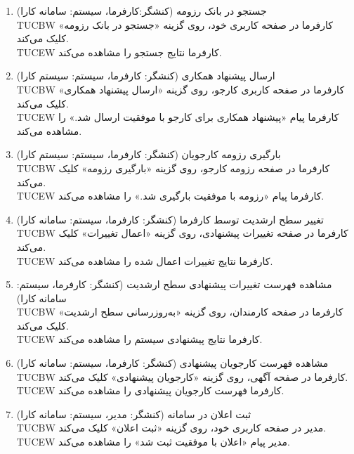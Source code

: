 \documentclass[12pt]{article}
\begin{document}
\begin{enumerate}
		\item
		جستجو در بانک رزومه (کنشگر:‌کارفرما، سیستم: سامانه کارا)\\
		TUCBW کارفرما در صفحه کاربری خود،‌ روی گزینه «جستجو در بانک رزومه» کلیک می‌کند.\\
		TUCEW کارفرما نتایج جستجو را مشاهده می‌کند.\\

		\item
		ارسال پیشنهاد همکاری (کنشگر: کارفرما، سیستم: سیستم کارا)\\
		TUCBW کارفرما در صفحه کاربری کارجو، روی گزینه «ارسال پیشنهاد همکاری» کلیک می‌کند.\\
		TUCEW کارفرما پیام «پیشنهاد همکاری برای کارجو با موفقیت ارسال شد.» را مشاهده می‌کند.\\

		\item
		بارگیری رزومه کارجویان (کنشگر: کارفرما، سیستم: سیستم کارا)\\
		TUCBW کارفرما در صفحه رزومه کارجو، روی گزینه «بارگیری رزومه» کلیک می‌کند.\\
		TUCEW کارفرما پیام «رزومه با موفقیت بارگیری شد.» را مشاهده می‌کند.\\

		\item
		تغییر سطح ارشدیت توسط کارفرما (کنشگر: کارفرما، سیستم: سامانه کارا)\\
		TUCBW کارفرما در صفحه تغییرات پیشنهادی، روی گزینه «اعمال تغییرات» کلیک می‌کند.\\
		TUCEW کارفرما نتایج تغییرات اعمال شده را مشاهده می‌کند.\\

		\item
		مشاهده فهرست تغییرات پیشنهادی سطح ارشدیت (کنشگر: کارفرما، سیستم: سامانه کارا)\\
		TUCBW کارفرما در صفحه کارمندان، روی گزینه «به‌روزرسانی سطح ارشدیت» کلیک می‌کند.\\
		TUCEW کارفرما نتایج پیشنهادی سیستم را مشاهده می‌کند.\\

		\item
		مشاهده فهرست کارجویان پیشنهادی (کنشگر: کارفرما، سیستم: سامانه کارا)\\
		TUCBW کارفرما در صفحه آگهی، روی گزینه «کارجویان پیشنهادی» کلیک می‌کند.\\
		TUCEW کارفرما فهرست کارجویان پیشنهادی را مشاهده می‌کند.\\

		\item
		ثبت اعلان در سامانه (کنشگر: مدیر، سیستم: سامانه کارا)\\
		TUCBW مدیر در صفحه کاربری خود، روی گزینه «ثبت اعلان» کلیک می‌کند.\\
		TUCEW مدیر پیام «اعلان با موفقیت ثبت شد» را مشاهده می‌کند.\\


\end{enumerate}
\end{document}
